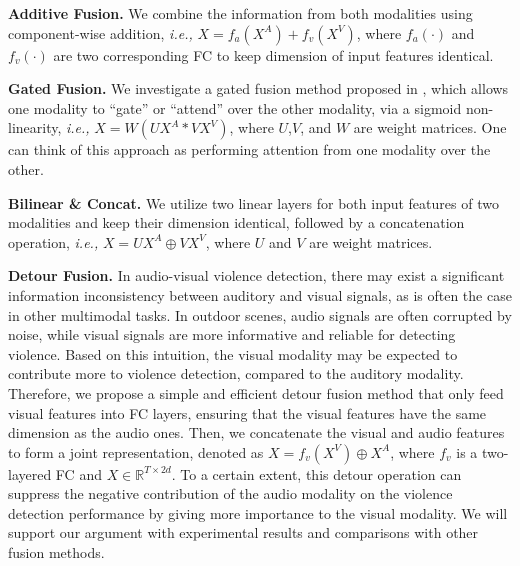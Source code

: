 \documentclass[sigconf]{acmart}
\newcommand{\ie}{{\emph{i.e., }}}
\begin{document}
\noindent\textbf{Additive Fusion.}
We combine the information from both modalities using component-wise addition, \ie $X = f_a(X^{A}) + f_v(X^{V})$, where $f_a(\cdot)$ and $f_v(\cdot)$ are two corresponding FC to keep dimension of input features identical.  

\noindent\textbf{Gated Fusion.}
We investigate a gated fusion method proposed in \cite{kiela2018efficient}, which allows one modality to “gate” or “attend” over the other modality, via a sigmoid non-linearity, \ie $X = W(UX^A * VX^V)$, where $U$,$V$, and $W$ are weight matrices. One can think of this approach as performing attention from one modality over the other. 

\noindent\textbf{Bilinear \& Concat.}
We utilize two linear layers for both input features of two modalities and keep their dimension identical, followed by a concatenation operation, \ie $X = UX^A \oplus VX^V$, where $U$ and $V$ are weight matrices.

\noindent\textbf{Detour Fusion.}
In audio-visual violence detection, there may exist a significant information inconsistency between auditory and visual signals, as is often the case in other multimodal tasks.  In outdoor scenes, audio signals are often corrupted by noise, while visual signals are more informative and reliable for detecting violence. Based on this intuition, the visual modality may be expected to contribute more to violence detection, compared to the auditory modality. Therefore, we propose a simple and efficient detour fusion method that only feed visual features into FC layers, ensuring that the visual features have the same dimension as the audio ones. Then, we concatenate the visual and audio features to form a joint representation, denoted as $X = f_v(X^V) \oplus X^A$, where $f_v$ is a two-layered FC and $X \in \mathbb{R}^{T\times 2d}$. To a certain extent, this detour operation can suppress the negative contribution of the audio modality on the violence detection performance by giving more importance to the visual modality. We will support our argument with experimental results and comparisons with other fusion methods.
\end{document}
